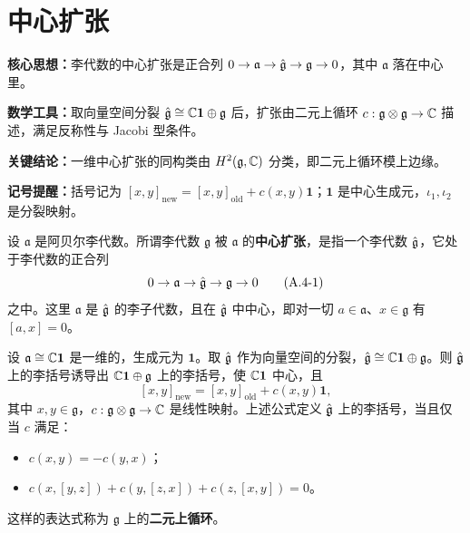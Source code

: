 \section{中心扩张}

\begin{keypoints}
    \item \textbf{核心思想：}李代数的中心扩张是正合列 $0\to\mathfrak a\to\hat{\mathfrak{g}}\to\mathfrak g\to0$，其中 $\mathfrak a$ 落在中心里。
    \item \textbf{数学工具：}取向量空间分裂 $\hat{\mathfrak{g}}\cong\mathbb{C}\mathbf 1\oplus\mathfrak g$ 后，扩张由二元上循环 $c:\mathfrak g\otimes\mathfrak g\to\mathbb{C}$ 描述，满足反称性与 Jacobi 型条件。
    \item \textbf{关键结论：}一维中心扩张的同构类由 $H^2(\mathfrak g,\mathbb{C})$ 分类，即二元上循环模上边缘。
    \item \textbf{记号提醒：}括号记为 $[x,y]_{\mathrm{new}}=[x,y]_{\mathrm{old}}+c(x,y)\mathbf 1$；$\mathbf 1$ 是中心生成元，$\iota_1,\iota_2$ 是分裂映射。
\end{keypoints}


设 $\mathfrak a$ 是阿贝尔李代数。所谓李代数 $\mathfrak g$ 被 $\mathfrak a$ 的\textbf{中心扩张}，是指一个李代数 $\hat{\mathfrak{g}}$，它处于李代数的正合列
\begin{equation}
    0\to\mathfrak a\to\hat{\mathfrak{g}}\to\mathfrak g\to 0
    \tag{A.4-1}
\end{equation}
之中。这里 $\mathfrak a$ 是 $\hat{\mathfrak{g}}$ 的李子代数，且在 $\hat{\mathfrak{g}}$ 中中心，即对一切 $a\in\mathfrak a$、$x\in\mathfrak g$ 有 $[a,x]=0$。


设 $\mathfrak a\cong\mathbb{C}\mathbf 1$ 是一维的，生成元为 $\mathbf 1$。取 $\hat{\mathfrak{g}}$ 作为向量空间的分裂，$\hat{\mathfrak{g}}\cong\mathbb{C}\mathbf 1\oplus\mathfrak g$。则 $\hat{\mathfrak{g}}$ 上的李括号诱导出 $\mathbb{C}\mathbf 1\oplus\mathfrak g$ 上的李括号，使 $\mathbb{C}\mathbf 1$ 中心，且
\[
    [x,y]_{\mathrm{new}}=[x,y]_{\mathrm{old}}+c(x,y)\mathbf 1,
\]
其中 $x,y\in\mathfrak g$，$c:\mathfrak g\otimes\mathfrak g\to\mathbb{C}$ 是线性映射。上述公式定义 $\hat{\mathfrak{g}}$ 上的李括号，当且仅当 $c$ 满足：
\begin{itemize}
    \item $c(x,y)=-c(y,x)$；
    \item $c(x,[y,z])+c(y,[z,x])+c(z,[x,y])=0$。
\end{itemize}
这样的表达式称为 $\mathfrak g$ 上的\textbf{二元上循环}。

